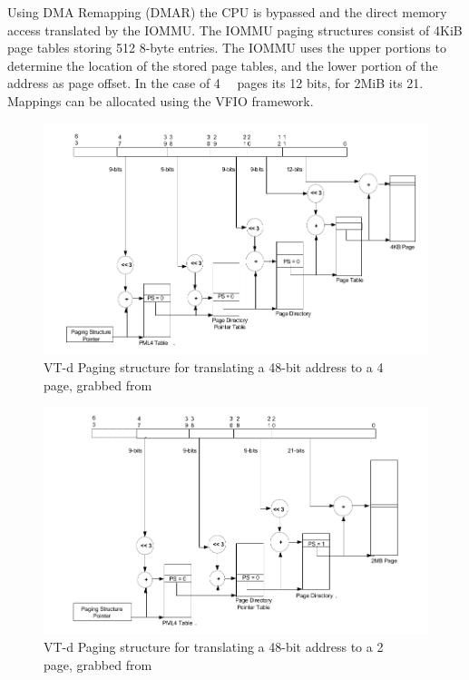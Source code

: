 Using DMA Remapping (DMAR) the CPU is bypassed and the direct memory access translated by the IOMMU.
The IOMMU paging structures consist of 4KiB page tables storing 512 8-byte entries. The IOMMU uses the upper portions to determine the location of the stored page tables, and the lower portion of the address as page offset. In the case of \qty{4}{\kibi\byte} pages its 12 bits, for 2MiB its 21.
Mappings can be allocated using the VFIO framework.


\begin{figure}
    \centering
    \includegraphics[width=\textwidth]{figures/4kibtranslation.pdf}
    \caption{VT-d Paging structure for translating a 48-bit address to a \qty{4}{\kibi\byte} page, grabbed from \cite{vtdspec}}
    \label{fig:pagewalk4kib}
\end{figure}
\begin{figure}
    \centering
    \includegraphics[width=\textwidth]{figures/2mibtranslation.pdf}
    \caption{VT-d Paging structure for translating a 48-bit address to a \qty{2}{\mebi\byte} page, grabbed from \cite{vtdspec}}
    \label{fig:pagewalk2mib}
\end{figure}

